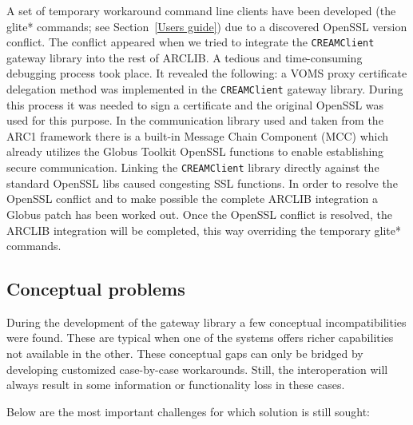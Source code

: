 \documentclass{article}
\begin{document}
A set of temporary workaround command line clients have been developed (the glite* commands; see Section~\ref{Users guide}) due to a discovered OpenSSL version conflict. The conflict appeared when we tried to integrate the \texttt{CREAMClient} gateway library into the rest of ARCLIB. A tedious and time-consuming debugging process took place. It revealed the following: a VOMS proxy certificate delegation method was implemented in the \texttt{CREAMClient} gateway library. During this process it was needed to sign a certificate and the original OpenSSL was used for this purpose. In the communication library used and taken from the ARC1 framework there is a built-in Message Chain Component (MCC) which already utilizes the Globus Toolkit OpenSSL functions to enable establishing secure communication. Linking the \texttt{CREAMClient} library directly against the standard OpenSSL libs caused congesting SSL functions. In order to resolve the OpenSSL conflict and to make possible the complete ARCLIB integration  a Globus patch has been worked out. Once the OpenSSL conflict is resolved, the ARCLIB integration will be completed, this way overriding the temporary glite* commands.

\subsection{Conceptual problems}
During the development of the gateway library a few conceptual incompatibilities were found. These are typical when one of the systems offers richer capabilities not available in the other. These conceptual gaps can only be bridged by developing customized case-by-case workarounds. Still, the interoperation will always result in some information or functionality loss in these cases.

Below are the most important challenges for which solution is still sought:
\end{document}
